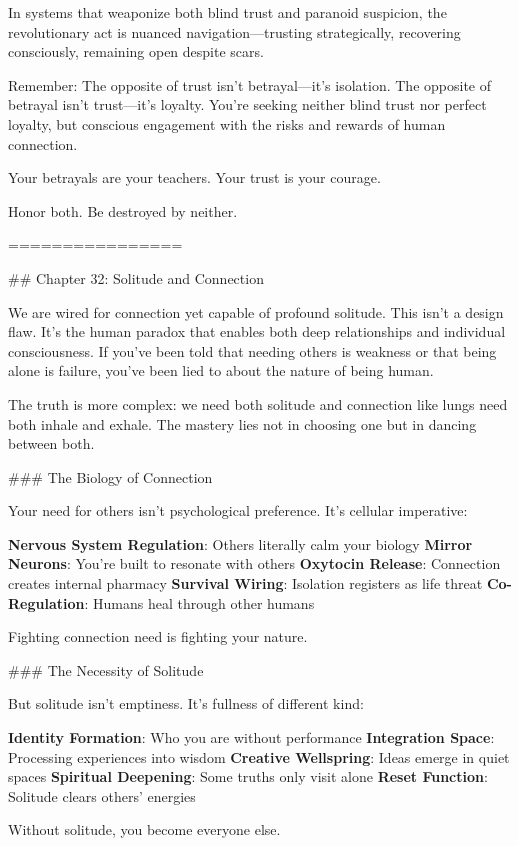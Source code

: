\documentclass[12pt]{book}
\begin{document}
In systems that weaponize both blind trust and paranoid suspicion, the revolutionary act is nuanced navigation—trusting strategically, recovering consciously, remaining open despite scars.

Remember: The opposite of trust isn't betrayal—it's isolation. The opposite of betrayal isn't trust—it's loyalty. You're seeking neither blind trust nor perfect loyalty, but conscious engagement with the risks and rewards of human connection.

Your betrayals are your teachers. Your trust is your courage.

Honor both. Be destroyed by neither.

================

\#\# Chapter 32: Solitude and Connection

We are wired for connection yet capable of profound solitude. This isn't a design flaw. It's the human paradox that enables both deep relationships and individual consciousness. If you've been told that needing others is weakness or that being alone is failure, you've been lied to about the nature of being human.

The truth is more complex: we need both solitude and connection like lungs need both inhale and exhale. The mastery lies not in choosing one but in dancing between both.

\#\#\# The Biology of Connection

Your need for others isn't psychological preference. It's cellular imperative:

\textbf{Nervous System Regulation}: Others literally calm your biology
\textbf{Mirror Neurons}: You're built to resonate with others
\textbf{Oxytocin Release}: Connection creates internal pharmacy
\textbf{Survival Wiring}: Isolation registers as life threat
\textbf{Co-Regulation}: Humans heal through other humans

Fighting connection need is fighting your nature.

\#\#\# The Necessity of Solitude

But solitude isn't emptiness. It's fullness of different kind:

\textbf{Identity Formation}: Who you are without performance
\textbf{Integration Space}: Processing experiences into wisdom
\textbf{Creative Wellspring}: Ideas emerge in quiet spaces
\textbf{Spiritual Deepening}: Some truths only visit alone
\textbf{Reset Function}: Solitude clears others' energies

Without solitude, you become everyone else.
\end{document}
